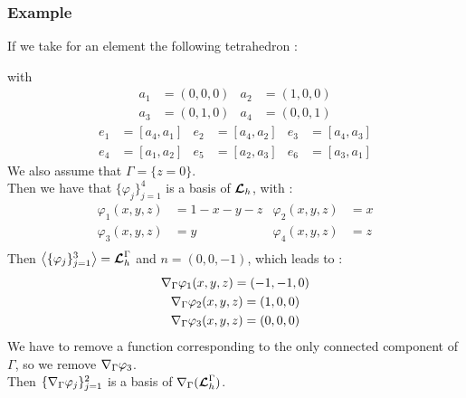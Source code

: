 \subsubsection{Example}
If we take for an element the following tetrahedron :
\begin{figure}[H]
\centering
{}
\end{figure}
with
\begin{align*}
a_1 &= (0,0,0) & a_2 &= (1,0,0)\\
a_3 &= (0,1,0) & a_4 &= (0,0,1)
\end{align*}
\begin{align*}
e_1 &= [a_4,a_1] & e_2 &= [a_4,a_2] & e_3 &= [a_4,a_3]\\
e_4 &= [a_1,a_2] & e_5 &= [a_2,a_3] & e_6 &= [a_3,a_1]
\end{align*}
We also assume that $\Gamma=\{z=0\}$.\\

Then we have that $\{\varphi_j\}_{j=1}^4$ is a basis of ${\bm{\mathcal{L}}}_h$, with :
\begin{align*}
\varphi_1(x,y,z) &= 1-x-y-z & \varphi_2(x,y,z) &= x\\
\varphi_3(x,y,z) &= y & \varphi_4(x,y,z) &= z\\
\end{align*}
Then $\left\langle\{\varphi_j\}_{j=1}^3\right\rangle={\bm{\mathcal{L}}}_h^\Gamma$ and
$n=(0,0,-1)$, which leads to :
\begin{gather*}
{\nabla}_\Gamma \varphi_1(x,y,z) = (-1,-1,0)\\
{\nabla}_\Gamma \varphi_2(x,y,z) = (1,0,0)\\
{\nabla}_\Gamma \varphi_3(x,y,z) = (0,0,0)
\end{gather*}
We have to remove a function corresponding to the only connected component of
$\Gamma$, so we remove ${\nabla}_\Gamma \varphi_3$.\\
Then $\{{\nabla}_\Gamma \varphi_j\}_{j=1}^2$ is a basis of
${\nabla}_\Gamma({\bm{\mathcal{L}}}_h^\Gamma)$.\\

